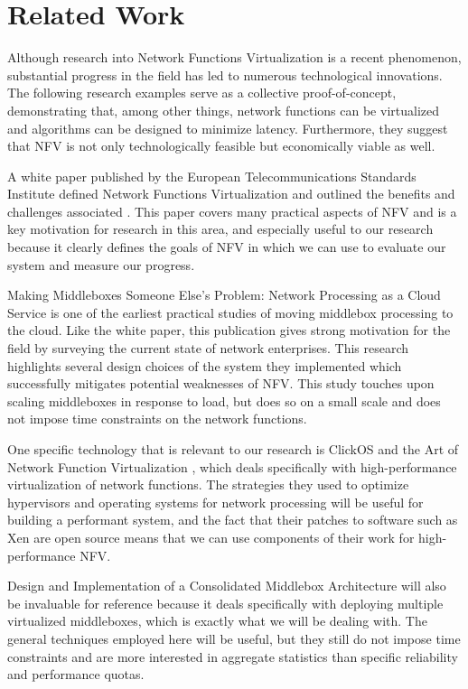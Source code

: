 \documentclass{sig-alternate}
\begin{document}
\section{Related Work}
\label{sec:related_work}
Although research into Network Functions Virtualization is a recent phenomenon, substantial progress in the field has led to numerous technological innovations. The following research examples serve as a collective proof-of-concept, demonstrating that, among other things, network functions can be virtualized and algorithms can be designed to minimize latency. Furthermore, they suggest that NFV is not only technologically feasible but economically viable as well.

A white paper published by the European Telecommunications Standards Institute defined Network Functions Virtualization and outlined the benefits and challenges associated \cite{white_paper}. This paper covers many practical aspects of NFV and is a key motivation for research in this area, and especially useful to our research because it clearly defines the goals of NFV in which we can use to evaluate our system and measure our progress.

Making Middleboxes Someone Else's Problem: Network Processing as a Cloud Service \cite{Sherry:2012:MMS:2342356.2342359} is one of the earliest practical studies of moving middlebox processing to the cloud. Like the white paper, this publication gives strong motivation for the field by surveying the current state of network enterprises. This research highlights several design choices of the system they implemented which successfully mitigates potential weaknesses of NFV. This study touches upon scaling middleboxes in response to load, but does so on a small scale and does not impose time constraints on the network functions.

One specific technology that is relevant to our research is ClickOS and the Art of Network Function Virtualization \cite{179771}, which deals specifically with high-performance virtualization of network functions. The strategies they used to optimize hypervisors and operating systems for network processing will be useful for building a performant system, and the fact that their patches to software such as Xen are open source means that we can use components of their work for high-performance NFV.

Design and Implementation of a Consolidated Middlebox Architecture \cite{Sekar:2012:DIC:2228298.2228331} will also be invaluable for reference because it deals specifically with deploying multiple virtualized middleboxes, which is exactly what we will be dealing with. The general techniques employed here will be useful, but they still do not impose time constraints and are more interested in aggregate statistics than specific reliability and performance quotas.
\end{document}
